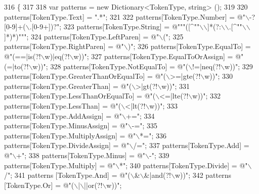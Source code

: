\begin{DoxyCode}
316         \{
317 
318             var patterns = \textcolor{keyword}{new} Dictionary<TokenType, string> ();
319 
320             patterns[TokenType.Text] = \textcolor{stringliteral}{".*"};
321 
322             patterns[TokenType.Number] = \textcolor{stringliteral}{@"\(\backslash\)-?[0-9]+(\(\backslash\).[0-9+])?"};
323             patterns[TokenType.String] = \textcolor{stringliteral}{@"""([^""\(\backslash\)\(\backslash\)]*(?:\(\backslash\)\(\backslash\).[^""\(\backslash\)\(\backslash\)]*)*)"""};
324             patterns[TokenType.LeftParen] = \textcolor{stringliteral}{@"\(\backslash\)("};
325             patterns[TokenType.RightParen] = \textcolor{stringliteral}{@"\(\backslash\))"};
326             patterns[TokenType.EqualTo] = \textcolor{stringliteral}{@"(==|is(?!\(\backslash\)w)|eq(?!\(\backslash\)w))"};
327             patterns[TokenType.EqualToOrAssign] = \textcolor{stringliteral}{@"(=|to(?!\(\backslash\)w))"};
328             patterns[TokenType.NotEqualTo] = \textcolor{stringliteral}{@"(\(\backslash\)!=|neq(?!\(\backslash\)w))"};
329             patterns[TokenType.GreaterThanOrEqualTo] = \textcolor{stringliteral}{@"(\(\backslash\)>=|gte(?!\(\backslash\)w))"};
330             patterns[TokenType.GreaterThan] = \textcolor{stringliteral}{@"(\(\backslash\)>|gt(?!\(\backslash\)w))"};
331             patterns[TokenType.LessThanOrEqualTo] = \textcolor{stringliteral}{@"(\(\backslash\)<=|lte(?!\(\backslash\)w))"};
332             patterns[TokenType.LessThan] = \textcolor{stringliteral}{@"(\(\backslash\)<|lt(?!\(\backslash\)w))"};
333             patterns[TokenType.AddAssign] = \textcolor{stringliteral}{@"\(\backslash\)+="};
334             patterns[TokenType.MinusAssign] = \textcolor{stringliteral}{@"\(\backslash\)-="};
335             patterns[TokenType.MultiplyAssign] = \textcolor{stringliteral}{@"\(\backslash\)*="};
336             patterns[TokenType.DivideAssign] = \textcolor{stringliteral}{@"\(\backslash\)/="};
337             patterns[TokenType.Add] = \textcolor{stringliteral}{@"\(\backslash\)+"};
338             patterns[TokenType.Minus] = \textcolor{stringliteral}{@"\(\backslash\)-"};
339             patterns[TokenType.Multiply] = \textcolor{stringliteral}{@"\(\backslash\)*"};
340             patterns[TokenType.Divide] = \textcolor{stringliteral}{@"\(\backslash\)/"};
341             patterns [TokenType.And] = \textcolor{stringliteral}{@"(\(\backslash\)&\(\backslash\)&|and(?!\(\backslash\)w))"};
342             patterns [TokenType.Or] = \textcolor{stringliteral}{@"(\(\backslash\)|\(\backslash\)||or(?!\(\backslash\)w))"};

\end{DoxyCode}
